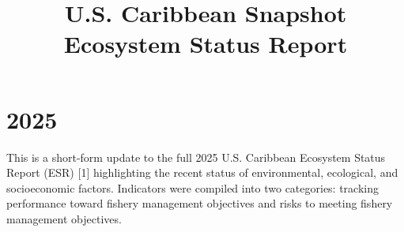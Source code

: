 \documentclass[
  10pt,
  letterpaper,
  DIV=11,
  numbers=noendperiod]{scrartcl}
\title{U.S. Caribbean \linebreak Snapshot Ecosystem Status Report}
\author{}
\date{}
\begin{document}
\maketitle



\vspace{-2.5cm}
\section{2025}

This is a short-form update to the full 2025 U.S. Caribbean Ecosystem
Status Report (ESR) {[}1{]} highlighting the recent status of
environmental, ecological, and socioeconomic factors. Indicators were
compiled into two categories: tracking performance toward fishery
management objectives and risks to meeting fishery management
objectives.
\end{document}
